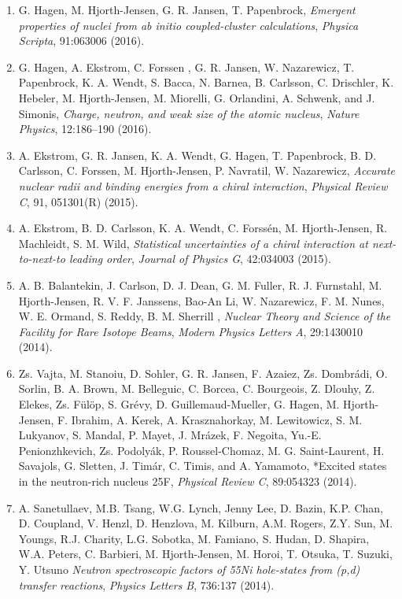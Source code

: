\documentclass[a4wide,10pt]{article}
\begin{document}
\begin{enumerate}
\item G. Hagen, M. Hjorth-Jensen, G. R. Jansen, T. Papenbrock, \emph{Emergent properties of nuclei from ab initio coupled-cluster calculations}, \emph{Physica Scripta}, 91:063006 (2016).

\item G. Hagen, A. Ekstrom, C. Forssen , G. R. Jansen, W. Nazarewicz, T. Papenbrock, K. A. Wendt, S. Bacca, N. Barnea, B. Carlsson, C. Drischler, K. Hebeler, M. Hjorth-Jensen, M. Miorelli, G. Orlandini, A. Schwenk, and J. Simonis,  \emph{Charge, neutron, and weak size of the atomic nucleus},  \emph{Nature Physics}, 12:186–190 (2016).

\item A. Ekstrom, G. R. Jansen, K. A. Wendt, G. Hagen, T. Papenbrock, B. D. Carlsson, C. Forssen, M. Hjorth-Jensen, P. Navratil, W. Nazarewicz,   \emph{Accurate nuclear radii and binding energies from a chiral interaction}, \emph{Physical Review C}, 91, 051301(R) (2015).

\item A. Ekstrom, B. D. Carlsson, K. A. Wendt, C. Forssén, M. Hjorth-Jensen, R. Machleidt, S. M. Wild,  \emph{Statistical uncertainties of a chiral interaction at next-to-next-to leading order},   \emph{Journal of Physics G}, 42:034003 (2015).

\item A. B. Balantekin, J. Carlson, D. J. Dean, G. M. Fuller, R. J. Furnstahl, M. Hjorth-Jensen, R. V. F. Janssens, Bao-An Li, W. Nazarewicz, F. M. Nunes, W. E. Ormand, S. Reddy, B. M. Sherrill ,  \emph{Nuclear Theory and Science of the Facility for Rare Isotope Beams},   \emph{Modern Physics Letters A}, 29:1430010 (2014).

\item Zs. Vajta, M. Stanoiu, D. Sohler, G. R. Jansen, F. Azaiez, Zs. Dombrádi, O. Sorlin, B. A. Brown, M. Belleguic, C. Borcea, C. Bourgeois, Z. Dlouhy, Z. Elekes, Zs. Fülöp, S. Grévy, D. Guillemaud-Mueller, G. Hagen, M. Hjorth-Jensen, F. Ibrahim, A. Kerek, A. Krasznahorkay, M. Lewitowicz, S. M. Lukyanov, S. Mandal, P. Mayet, J. Mrázek, F. Negoita, Yu.-E. Penionzhkevich, Zs. Podolyák, P. Roussel-Chomaz, M. G. Saint-Laurent, H. Savajols, G. Sletten, J. Timár, C. Timis, and A. Yamamoto,   *Excited states in the neutron-rich nucleus 25F,   \emph{Physical Review C}, 89:054323 (2014).

\item A. Sanetullaev, M.B. Tsang, W.G. Lynch, Jenny Lee, D. Bazin, K.P. Chan, D. Coupland, V. Henzl, D. Henzlova, M. Kilburn, A.M. Rogers, Z.Y. Sun, M. Youngs, R.J. Charity, L.G. Sobotka, M. Famiano, S. Hudan, D. Shapira, W.A. Peters, C. Barbieri, M. Hjorth-Jensen, M. Horoi, T. Otsuka, T. Suzuki, Y. Utsuno  \emph{Neutron spectroscopic factors of 55Ni hole-states from (p,d) transfer reactions},   \emph{Physics Letters B}, 736:137 (2014).


\end{enumerate}
\end{document}
